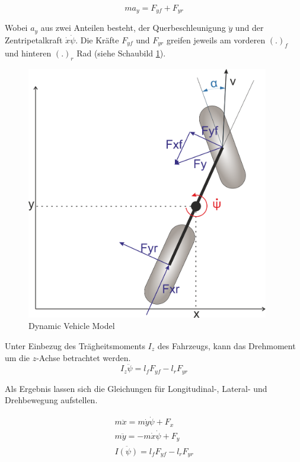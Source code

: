 \documentclass{like}
\begin{document}
\begin{equation}
ma_y = F_{yf} + F_{yr}
\end{equation}   


Wobei \(a_y\) aus zwei Anteilen besteht, der Querbeschleunigung \(\ddot{y}\) und der Zentripetalkraft \(\dot{x} \dot{\psi}\).  
Die Kräfte \(F_{yf}\) und \(F_{yr}\) greifen jeweils am vorderen \((.)_f\) und hinteren \((.)_r\) Rad (siehe Schaubild \ref{fig:dynModel}). 

\begin{figure}[hb!]
	\centering
	\includegraphics[width=300pt]{Abbildungen/dynBicycle.png}
	\caption{Dynamic Vehicle Model}
	\label{fig:dynModel}
\end{figure}




Unter Einbezug des Trägheitsmoments \(I_z\) des Fahrzeugs, kann das Drehmoment um die \(z\)-Achse betrachtet werden.
\begin{equation}
I_z \ddot{\psi} = l_f F_{yf} - l_r F_{yr}
\end{equation}

Als Ergebnis lassen sich die Gleichungen für Longitudinal-, Lateral- und Drehbewegung aufstellen.

\begin{eqnarray}
m \ddot{x} = m \dot{y} \dot{\psi} + F_x \\
m \ddot{y} = - m \dot{x} \dot{\psi} + F_y \\
I \ddot{(\psi)} = l_f F_{yf} - l_r F_{yr}
\end{eqnarray}
\end{document}
